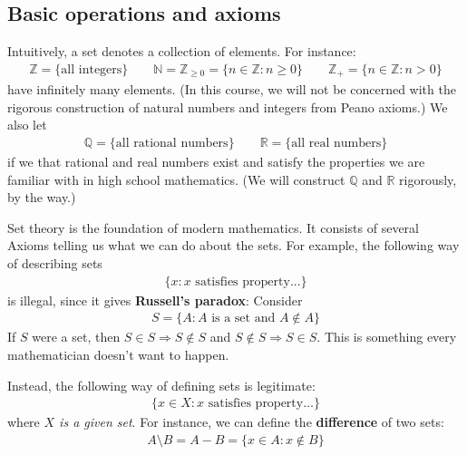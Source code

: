 \documentclass[12pt,b5paper,notitlepage]{article}
\theoremstyle{definition}
\theoremstyle{plain}
\newcommand{\Nbb}{\mathbb N}
\newcommand{\Zbb}{\mathbb Z}
\newcommand{\Qbb}{\mathbb Q}
\newcommand{\Rbb}{\mathbb R}
\numberwithin{equation}{section}
\begin{document}



\subsection{Basic operations and axioms}
Intuitively, a set denotes a collection of elements. For instance:\index{N@$\Nbb=\{0,1,2,\dots\}$} \index{Z@$\Zbb_+=\{1,2,\dots\}$}
\begin{gather*}
\Zbb=\{\text{all integers}\}\qquad \Nbb=\Zbb_{\geq0}=\{n\in\Zbb:n\geq0\}\qquad \Zbb_+=\{n\in\Zbb:n>0\}
\end{gather*}
have infinitely many elements. (In this course, we will not be concerned with the rigorous construction of natural numbers and integers from Peano axioms.) We also let
\begin{align*}
\Qbb=\{\text{all rational numbers}\}\qquad\Rbb=\{\text{all real numbers}\}
\end{align*}
if we that rational and real numbers exist and satisfy the properties we are familiar with in high school mathematics. (We will construct $\Qbb$ and $\Rbb$ rigorously, by the way.)


Set theory is the foundation of modern mathematics. It consists of several Axioms telling us what we can do about the sets. For example, the following way of describing sets
\begin{align}
\{x: x\text{ satisfies property...}\}  \label{eq1}
\end{align}
is illegal, since it gives \textbf{Russell's paradox}: Consider
\begin{align}
S=\{A: A\text{ is a set and }A\notin A\}\label{eq12}
\end{align}
If $S$ were a set, then $S\in S\Rightarrow S\notin S$ and $S\notin S\Rightarrow S\in S$. This is something every mathematician doesn't want to happen.

Instead, the following way of defining sets is legitimate:
\begin{align}
\{x\in X:x\text{ satisfies property}\dots\}  \label{eq2}
\end{align}
where \textit{$X$ is a given set}.  For instance, we can define the \textbf{difference} of two sets:
\begin{align*}
A\setminus B=A-B=\{x\in A:x\notin B\}
\end{align*}
\end{document}
